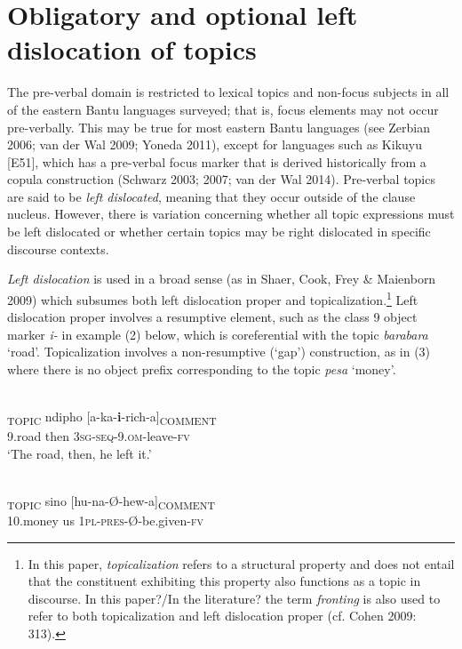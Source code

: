 \documentclass[output=paper]{langsci/langscibook}
\begin{document}
\section{Obligatory and optional left dislocation of topics}

The pre-verbal domain is restricted to lexical topics and non-focus subjects in all of the eastern Bantu languages surveyed; that is, focus elements may not occur pre-verbally. This may be true for most eastern Bantu languages (see Zerbian 2006; van der Wal 2009; Yoneda 2011), except for languages such as Kikuyu [E51], which has a pre-verbal focus marker that is derived historically from a copula construction (Schwarz 2003; 2007; van der Wal 2014). Pre-verbal topics are said to be \textit{left dislocated}, meaning that they occur outside of the clause nucleus. However, there is variation concerning whether all topic expressions must be left dislocated or whether certain topics may be right dislocated in specific discourse contexts.

\textit{Left dislocation} is used in a broad sense (as in Shaer, Cook, Frey \& Maienborn 2009) which subsumes both left dislocation proper and topicalization.\footnote{In this paper, \textit{topicalizat}\textit{ion} refers to a structural property and does not entail that the constituent exhibiting this property also functions as a topic in discourse. In this paper?/In the literature? the term \textit{fronting} is also used to refer to both topicalization and left dislocation proper (cf. Cohen 2009: 313).} Left dislocation proper involves a resumptive element, such as the class 9 object marker \textit{i}\textit{\nobreakdash-} in example (2) below, which is coreferential with the topic \textit{barabara} ‘road’. Topicalization involves a non-resumptive (‘gap’) construction, as in (3) where there is no object prefix corresponding to the topic \textit{pesa} ‘money’.

\ea\label{ex:}
\\
\gll [Barabara]\textsubscript{TOPIC} ndipho [a-ka-\textbf{i}{}-rich-a]\textsubscript{COMMENT}\\
     9.road then \textsc{3sg-seq}{}-9.\textsc{om}{}-leave-\textsc{fv}\\
\glt \textup{‘}\textup{The road, then, he left it.’}
\z

\ea\label{ex:}
\\
\gll [Pesa]\textsubscript{TOPIC} sino [hu-na-Ø-hew-a]\textsubscript{COMMENT}\\
10.money us \textsc{1pl-pres}{}-Ø-be.given-\textsc{fv} \\
\end{document}

